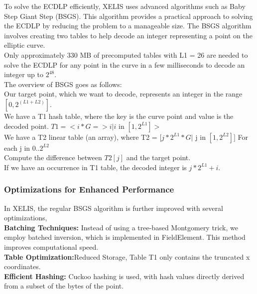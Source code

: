 \documentclass[12pt,a4paper,twocolumn]{article}
\begin{document}
To solve the ECDLP efficiently, XELIS uses advanced algorithms such as Baby Step Giant Step (BSGS). This algorithm provides a practical approach to solving the ECDLP by reducing the problem to a manageable size. The BSGS algorithm involves creating two tables to help decode an integer representing a point on the elliptic curve. \\

Only approximately 330 MB of precomputed tables with L1 = 26 are needed to solve the ECDLP for any point in the curve in a few milliseconds to decode an integer up to \(2^{48}\).\\

The overview of BSGS goes as follows:\\

Our target point, which we want to decode, represents an integer in the range \([0, 2^{(L1 + L2)}]\).\\

We have a T1 hash table, where the key is the curve point and value is the decoded point. \(T1 = <i * G => i | i\) in \([1, 2^{L1}]>\)\\

We have a T2 linear table (an array), where T2 = \([j * 2^{L1} * G |\) j in \([1, 2^{L2}]]\)
For each j in \(0..2^{L2}\)\\

Compute the difference between \(T2[j]\) and the target point.\\

If we have an occurrence in T1 table, the decoded integer is \(j * 2^{L1} + i\).\\

\subsubsection{Optimizations for Enhanced Performance}

In XELIS, the regular BSGS algorithm is further improved with several optimizations,\\

\textbf{Batching Techniques:} Instead of using a tree-based Montgomery trick, we employ batched inversion, which is implemented in FieldElement. This method improves computational speed.\\

\textbf{Table Optimization:}Reduced Storage, Table T1 only contains the truncated x coordinates.\\

\textbf{Efficient Hashing:} Cuckoo hashing is used, with hash values directly derived from a subset of the bytes of the point.\\
\end{document}
